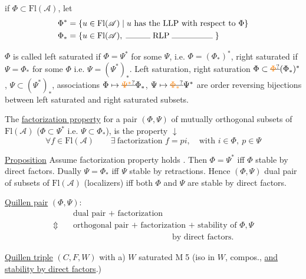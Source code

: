 if $\Phi\subset\mathrm{Fl}(\mathscr A)$, let
\[
\begin{aligned}
\Phi^*&=\{u\in\mathrm{Fl}(\mathscr A)\mid u\text{ has the LLP with respect to }\Phi\}\\
\Phi_*&=\{u\in\mathrm{Fl}(\mathscr A),\;\rule{3em}{.3pt}\;\mathrm{RLP}\;\rule{5em}{.3pt}\;\}
\end{aligned}
\]

$\Phi$ is called left saturated if $\Phi=\Psi^*$ for some $\Psi$, i.e. $\Phi=(\Phi_*)^*$, \inserted{$\Psi$} right saturated if  $\Psi=\Phi_*$ for some $\Phi$ i.e. $\Psi=(\Psi^*)_*$. Left saturation, right saturation $\Phi\subset\deleted{\unsure{\Phi}}(\Phi_*)^*$, $\Psi\subset(\Psi^*)_*$, associations $\Phi\mapsto\deleted{\unsure{\Psi^*}}\Phi_*$, $\Psi\mapsto\deleted{\unsure{\Phi_*}}\Psi^*$ are order reversing bijections between left saturated and right saturated subsets.

The \uline{factorization property} for a pair $(\Phi,\Psi)$ of mutually orthogonal subsets of $\mathrm{Fl}(\mathscr A)$ ($\Phi\subset\Psi^*$ i.e. $\Psi\subset\Phi_*$), is the property  $\downarrow$
\[
\forall f\in\mathrm{Fl}(\mathscr A)\qquad \exists\ \text{factorization }f=pi,\quad\text{with }i\in\Phi,\ p\in\Psi
\]


 \uline{Proposition} Assume factorization property holds . Then $\Phi=\Psi^*$ iff $\Phi$ stable by direct factors. Dually $\Psi=\Phi_*$ iff $\Psi$ stable by retractions. Hence $(\Phi,\Psi)$  dual pair of subsets of $\mathrm{Fl}(\mathscr A)$ (localizers) iff   both $\Phi$ and $\Psi$ are stable by direct factors.

\uline{Quillen pair} $(\Phi,\Psi)$:
\[
\begin{aligned}
 &\text{dual pair + factorization}\\
\Updownarrow\quad&\text{orthogonal pair + factorization + stability of }\Phi,\Psi\\
 &\hspace{12em}\text{by direct factors.}
\end{aligned}
\]

 \uline{Quillen triple} $(C,F,W)$ with a) $W$  saturated \textcircled{M5} (iso  in $W$,   compos., \uline{and stability by direct factors}.)

